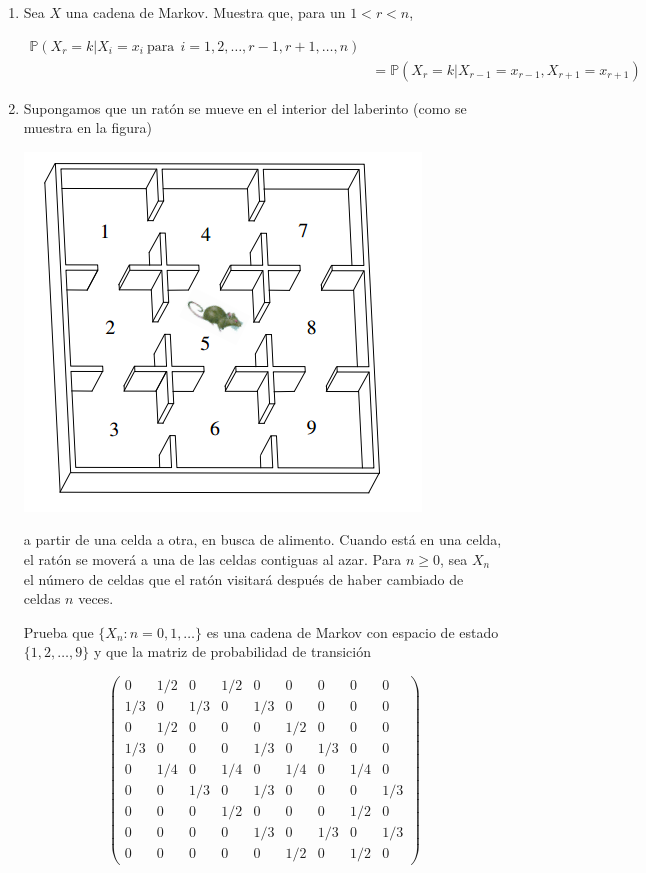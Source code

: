 \documentclass[a4paper,11pt]{report}
\newcommand{\PR}{\mathbb{P}}
\begin{document}
\begin{enumerate}
\item Sea $X$ una cadena de Markov. Muestra que, para un $1 < r < n$,

\begin{align*}
\PR(X_r = k | X_i = x_i \ \text{para}\ \ i =  1,2,\dots, r -1, r +1, \dots, n) & \\
& = \PR(X_r = k | X_{r -1} = x_{r -1}, X_{r + 1} = x_{r +1})
\end{align*}

\item Supongamos que un rat\'on se mueve en el interior del laberinto (como se muestra en la figura)

\begin{center}
\includegraphics[scale=0.55]{p2}
\end{center}

a partir de una celda  a otra, en busca de alimento. Cuando est\'a en una celda, el rat\'on se mover\'a a una de las celdas contiguas al azar. Para $n \geq  0$, sea  $X_n$ el n\'umero de celdas  que  el rat\'on visitar\'a despu\'es de haber cambiado de  celdas  $n$ veces.

Prueba que $\{X_n: n = 0,1,\dots \}$ es una cadena de Markov con espacio de estado $\{1, 2, \dots , 9  \}$ y que la matriz de probabilidad de transici\'on

\[
\begin{pmatrix}
0 & 1/2 & 0 & 1/2 & 0 & 0 & 0 & 0 & 0\\
1/3 & 0 &  1/3 &  0 & 1/3 &  0 & 0 & 0 &  0\\
0 & 1/2 &  0 &  0 &  0 & 1/2 & 0 & 0 & 0 \\
1/3 & 0 & 0 & 0 & 1/3 &  0 & 1/3 & 0 & 0 \\
0 & 1/4 & 0 & 1/4 & 0 & 1/4 & 0 & 1/4 & 0\\
0 & 0 & 1/3 &0 & 1/3 & 0 & 0 & 0 & 1/3 \\
0 & 0 & 0  & 1/2 & 0 & 0 & 0 & 1/2 & 0\\
0 & 0 &  0 &  0 & 1/3 & 0  & 1/3 &  0 & 1/3\\
0 & 0 & 0 & 0 & 0 & 1/2 & 0 & 1/2 &  0
\end{pmatrix}
\]


\end{enumerate}
\end{document}
